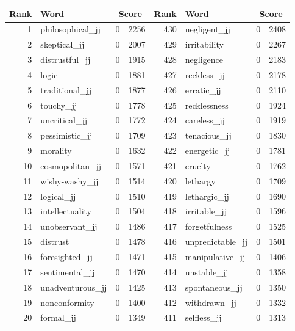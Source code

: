 \begin{table}[tbp]
    \begin{tabular}{| rlr@{.}l | rlr@{.}l |}
    \hline
    \textbf{Rank} & \textbf{Word} & \multicolumn{2}{c|}{\textbf{Score}} & \textbf{Rank} & \textbf{Word} & \multicolumn{2}{c|}{\textbf{Score}} \\
    \hline
    1 & philosophical\_jj & 0 & 2256    &    430 & negligent\_jj & 0 & 2408 \\
    2 & skeptical\_jj & 0 & 2007    &    429 & irritability & 0 & 2267 \\
    3 & distrustful\_jj & 0 & 1915    &    428 & negligence & 0 & 2183 \\
    4 & logic & 0 & 1881    &    427 & reckless\_jj & 0 & 2178 \\
    5 & traditional\_jj & 0 & 1877    &    426 & erratic\_jj & 0 & 2110 \\
    6 & touchy\_jj & 0 & 1778    &    425 & recklessness & 0 & 1924 \\
    7 & uncritical\_jj & 0 & 1772    &    424 & careless\_jj & 0 & 1919 \\
    8 & pessimistic\_jj & 0 & 1709    &    423 & tenacious\_jj & 0 & 1830 \\
    9 & morality & 0 & 1632    &    422 & energetic\_jj & 0 & 1781 \\
    10 & cosmopolitan\_jj & 0 & 1571    &    421 & cruelty & 0 & 1762 \\
    11 & wishy-washy\_jj & 0 & 1514    &    420 & lethargy & 0 & 1709 \\
    12 & logical\_jj & 0 & 1510    &    419 & lethargic\_jj & 0 & 1690 \\
    13 & intellectuality & 0 & 1504    &    418 & irritable\_jj & 0 & 1596 \\
    14 & unobservant\_jj & 0 & 1486    &    417 & forgetfulness & 0 & 1525 \\
    15 & distrust & 0 & 1478    &    416 & unpredictable\_jj & 0 & 1501 \\
    16 & foresighted\_jj & 0 & 1471    &    415 & manipulative\_jj & 0 & 1406 \\
    17 & sentimental\_jj & 0 & 1470    &    414 & unstable\_jj & 0 & 1358 \\
    18 & unadventurous\_jj & 0 & 1425    &    413 & spontaneous\_jj & 0 & 1350 \\
    19 & nonconformity & 0 & 1400    &    412 & withdrawn\_jj & 0 & 1332 \\
    20 & formal\_jj & 0 & 1349    &    411 & selfless\_jj & 0 & 1313 \\

\end{tabular}
\end{table}
